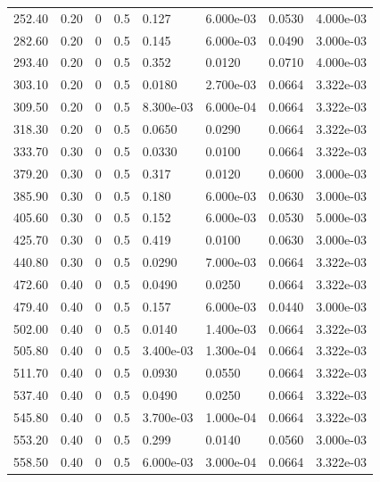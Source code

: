 \documentclass[preview]{standalone}
\begin{document}
{{\begin{tabular}{L{1.2cm}C{1.2cm} C{0.3cm}C{0.5cm} C{1.4cm}C{1.4cm} C{1.4cm}C{1.4cm}}
  252.40  &  0.20  & 0     & 0.5 &  0.127  & 6.000e-03  & 0.0530 &  4.000e-03   \\ 
  282.60  &  0.20  & 0     & 0.5 &  0.145  & 6.000e-03  & 0.0490 &  3.000e-03   \\ 
  293.40  &  0.20  & 0     & 0.5 &  0.352  & 0.0120  & 0.0710 &  4.000e-03   \\ 
  303.10  &  0.20  & 0     & 0.5 &  0.0180  & 2.700e-03  & 0.0664 &  3.322e-03   \\ 
  309.50  &  0.20  & 0     & 0.5 &  8.300e-03  & 6.000e-04  & 0.0664 &  3.322e-03   \\ 
  318.30  &  0.20  & 0     & 0.5 &  0.0650  & 0.0290  & 0.0664 &  3.322e-03   \\ 
  333.70  &  0.30  & 0     & 0.5 &  0.0330  & 0.0100  & 0.0664 &  3.322e-03   \\ 
  379.20  &  0.30  & 0     & 0.5 &  0.317  & 0.0120  & 0.0600 &  3.000e-03   \\ 
  385.90  &  0.30  & 0     & 0.5 &  0.180  & 6.000e-03  & 0.0630 &  3.000e-03   \\ 
  405.60  &  0.30  & 0     & 0.5 &  0.152  & 6.000e-03  & 0.0530 &  5.000e-03   \\ 
  425.70  &  0.30  & 0     & 0.5 &  0.419  & 0.0100  & 0.0630 &  3.000e-03   \\ 
  440.80  &  0.30  & 0     & 0.5 &  0.0290  & 7.000e-03  & 0.0664 &  3.322e-03   \\ 
  472.60  &  0.40  & 0     & 0.5 &  0.0490  & 0.0250  & 0.0664 &  3.322e-03   \\ 
  479.40  &  0.40  & 0     & 0.5 &  0.157  & 6.000e-03  & 0.0440 &  3.000e-03   \\ 
  502.00  &  0.40  & 0     & 0.5 &  0.0140  & 1.400e-03  & 0.0664 &  3.322e-03   \\ 
  505.80  &  0.40  & 0     & 0.5 &  3.400e-03  & 1.300e-04  & 0.0664 &  3.322e-03   \\ 
  511.70  &  0.40  & 0     & 0.5 &  0.0930  & 0.0550  & 0.0664 &  3.322e-03   \\ 
  537.40  &  0.40  & 0     & 0.5 &  0.0490  & 0.0250  & 0.0664 &  3.322e-03   \\ 
  545.80  &  0.40  & 0     & 0.5 &  3.700e-03  & 1.000e-04  & 0.0664 &  3.322e-03   \\ 
  553.20  &  0.40  & 0     & 0.5 &  0.299  & 0.0140  & 0.0560 &  3.000e-03   \\ 
  558.50  &  0.40  & 0     & 0.5 &  6.000e-03  & 3.000e-04  & 0.0664 &  3.322e-03   \\ 

\end{tabular}}}
\end{document}
